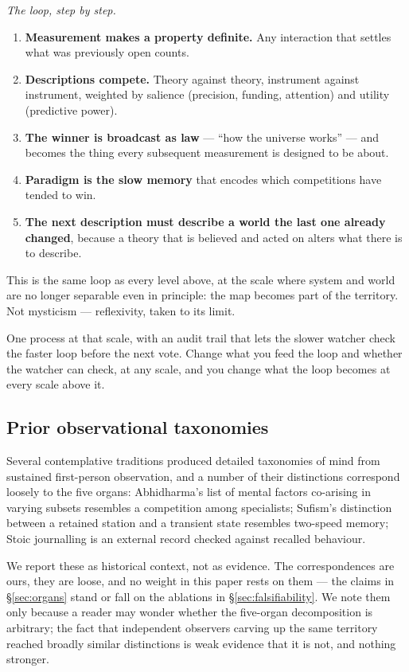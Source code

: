 \documentclass[11pt]{article}
\begin{document}
{\textit{The loop, step by step.}
\begin{enumerate}\itemsep2pt
\item \textbf{Measurement makes a property definite.} Any interaction that
settles what was previously open counts.
\item \textbf{Descriptions compete.} Theory against theory, instrument
against instrument, weighted by salience (precision, funding, attention)
and utility (predictive power).
\item \textbf{The winner is broadcast as law} --- ``how the universe
works'' --- and becomes the thing every subsequent measurement is designed
to be about.
\item \textbf{Paradigm is the slow memory} that encodes which competitions
have tended to win.
\item \textbf{The next description must describe a world the last one
already changed}, because a theory that is believed and acted on alters
what there is to describe.
\end{enumerate}

This is the same loop as every level above, at the scale where system and
world are no longer separable even in principle: the map becomes part of
the territory. Not mysticism --- reflexivity, taken to its limit.

One process at that scale, with an audit trail that lets the slower watcher check the faster loop before the next vote. Change what you feed the loop and whether the watcher can check, at any scale, and you change what the loop becomes at every scale above it.

\subsection{Prior observational taxonomies}
\label{sec:traditions}

Several contemplative traditions produced detailed taxonomies of mind from
sustained first-person observation, and a number of their distinctions
correspond loosely to the five organs: Abhidharma's list of mental factors
co-arising in varying subsets resembles a competition among specialists;
Sufism's distinction between a retained station and a transient state
resembles two-speed memory; Stoic journalling is an external record checked
against recalled behaviour.

We report these as historical context, not as evidence. The correspondences
are ours, they are loose, and no weight in this paper rests on them --- the
claims in \S\ref{sec:organs} stand or fall on the ablations in
\S\ref{sec:falsifiability}. We note them only because a reader may wonder
whether the five-organ decomposition is arbitrary; the fact that independent
observers carving up the same territory reached broadly similar distinctions
is weak evidence that it is not, and nothing stronger.

}
\end{document}
